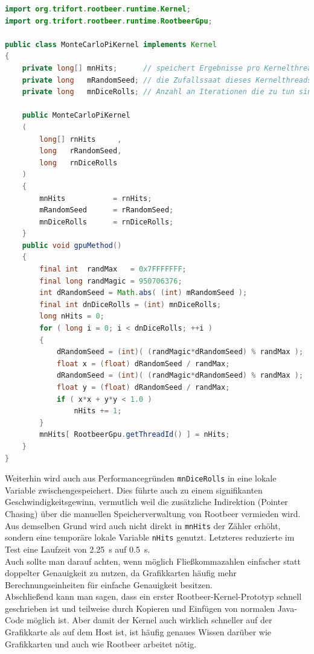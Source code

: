 \begin{lstlisting}[language=Java,caption={Implementation der Monte-Carlo-Integration für Pi},label=lst:pikernel]
import org.trifort.rootbeer.runtime.Kernel;
import org.trifort.rootbeer.runtime.RootbeerGpu;

public class MonteCarloPiKernel implements Kernel
{
    private long[] mnHits;      // speichert Ergebnisse pro Kernelthread
    private long   mRandomSeed; // die Zufallssaat dieses Kernelthreads
    private long   mnDiceRolls; // Anzahl an Iterationen die zu tun sind

    public MonteCarloPiKernel
    (
        long[] rnHits     ,
        long   rRandomSeed,
        long   rnDiceRolls
    )
    {
        mnHits           = rnHits;
        mRandomSeed      = rRandomSeed;
        mnDiceRolls      = rnDiceRolls;
    }
    public void gpuMethod()
    {
        final int  randMax   = 0x7FFFFFFF;
        final long randMagic = 950706376;
        int dRandomSeed = Math.abs( (int) mRandomSeed );
        final int dnDiceRolls = (int) mnDiceRolls;
        long nHits = 0;
        for ( long i = 0; i < dnDiceRolls; ++i )
        {
            dRandomSeed = (int)( (randMagic*dRandomSeed) % randMax );
            float x = (float) dRandomSeed / randMax;
            dRandomSeed = (int)( (randMagic*dRandomSeed) % randMax );
            float y = (float) dRandomSeed / randMax;
            if ( x*x + y*y < 1.0 )
                nHits += 1;
        }
        mnHits[ RootbeerGpu.getThreadId() ] = nHits;
    }
}
\end{lstlisting}

Weiterhin wird auch aus Performancegründen \lstinline!mnDiceRolls! in eine lokale Variable zwischengespeichert. Dies führte auch zu einem signifikanten Geschwindigkeitsgewinn, vermutlich weil die zusätzliche Indirektion (Pointer Chasing) über die manuellen Speicherverwaltung von Rootbeer vermieden wird. Aus demselben Grund wird auch nicht direkt in \lstinline!mnHits! der Zähler erhöht, sondern eine temporäre lokale Variable \lstinline!nHits! genutzt. Letzteres reduzierte im Test eine Laufzeit von \SI{2.25}{\second} auf \SI{0.5}{\second}.\\

Auch sollte man darauf achten, wenn möglich Fließkommazahlen einfacher statt doppelter Genauigkeit zu nutzen, da Grafikkarten häufig mehr Berechnungseinheiten für einfache Genauigkeit besitzen.\\

Abschließend kann man sagen, dass ein erster Rootbeer-Kernel-Prototyp schnell geschrieben ist und teilweise durch Kopieren und Einfügen von normalen Java-Code möglich ist. Aber damit der Kernel auch wirklich schneller auf der Grafikkarte als auf dem Host ist, ist häufig genaues Wissen darüber wie Grafikkarten und auch wie Rootbeer arbeitet nötig.


